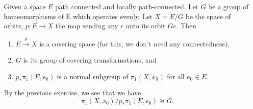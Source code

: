 \documentclass[12pt]{article}
\begin{document}
\begin{exe} \label{exe:quotientcoveringpspace}
	Given a space $E$ path connected and locally path-connected. Let $G$ be a group of homeomorphisms of E which operates evenly. Let $X = E/G$ be the space of orbits, $p :E \to X$ the map sending any $e$ onto its orbit $Ge.$ Then 
	\begin{enumerate}
	 	\item $E \overset{p}{\longrightarrow} X$ is a covering space (for this, we don't need any connectedness), 
	 	\item $G$ is its group of covering transformations, and 
	 	\item $p_*\pi_1(E, e_0)$ is a normal subgroup of $\pi_1(X, x_0)$ for all $e_0 \in E.$ 
	\end{enumerate} 
	By the previous exercise, we see that we have
	\begin{equation*} 
		\pi_1(X, x_0)/p_*\pi_1(E, e_0) \cong G.
	\end{equation*}
\end{exe}
\end{document}

